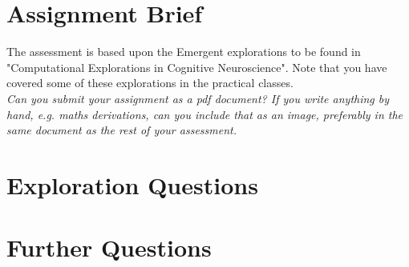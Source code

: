 \documentclass[12pt]{article}
\begin{document}


\section{Assignment Brief}
\label{Assignment Brief Section}

The assessment is based upon the Emergent explorations to be found in "Computational Explorations in Cognitive Neuroscience". Note that you have covered some of these explorations in the practical classes. \\

\emph{Can you submit your assignment as a pdf document? If you write anything by hand, e.g. maths derivations, can you include that as an image, preferably in the same document as the rest of your assessment.} 

\section{Exploration Questions}
\label{Exploration Questions Section}




\section{Further Questions}
\label{Further Questions Section}



%
%

%
\end{document}
